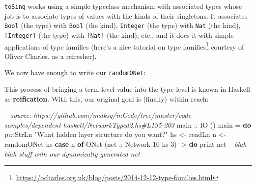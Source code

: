 \documentclass[]{article}
\newenvironment{Shaded}{}{}
\newcommand{\KeywordTok}[1]{\textcolor[rgb]{0.00,0.44,0.13}{\textbf{{#1}}}}
\newcommand{\DataTypeTok}[1]{\textcolor[rgb]{0.56,0.13,0.00}{{#1}}}
\newcommand{\DecValTok}[1]{\textcolor[rgb]{0.25,0.63,0.44}{{#1}}}
\newcommand{\StringTok}[1]{\textcolor[rgb]{0.25,0.44,0.63}{{#1}}}
\newcommand{\CommentTok}[1]{\textcolor[rgb]{0.38,0.63,0.69}{\textit{{#1}}}}
\newcommand{\OtherTok}[1]{\textcolor[rgb]{0.00,0.44,0.13}{{#1}}}
\newcommand{\FunctionTok}[1]{\textcolor[rgb]{0.02,0.16,0.49}{{#1}}}
\newcommand{\NormalTok}[1]{{#1}}
\renewcommand{\href}[2]{#2\footnote{\url{#1}}}
\begin{document}
\texttt{toSing} works using a simple typeclass mechanism with associated types
whose job is to associate types of values with the kinds of their singletons. It
associates \texttt{Bool} (the type) with \texttt{Bool} (the kind),
\texttt{Integer} (the type) with \texttt{Nat} (the kind), \texttt{{[}Integer{]}}
(the type) with \texttt{{[}Nat{]}} (the kind), etc., and it does it with simple
applications of type families (here's a
\href{https://ocharles.org.uk/blog/posts/2014-12-12-type-families.html}{nice
tutorial on type families} courtesy of Oliver Charles, as a refresher).

We now have enough to write our \texttt{randomONet}:

\begin{Shaded}
\end{Shaded}

This process of bringing a term-level value into the type level is known in
Haskell as \textbf{reification}. With this, our original goal is (finally)
within reach:

\begin{Shaded}
\begin{Highlighting}[]
\CommentTok{-- source: https://github.com/mstksg/inCode/tree/master/code-samples/dependent-haskell/NetworkTyped2.hs#L195-203}
\OtherTok{main ::} \DataTypeTok{IO} \NormalTok{()}
\NormalTok{main }\FunctionTok{=} \KeywordTok{do}
    \NormalTok{putStrLn }\StringTok{"What hidden layer structure do you want?"}
    \NormalTok{hs }\OtherTok{<-} \NormalTok{readLn}
    \NormalTok{n  }\OtherTok{<-} \NormalTok{randomONet hs}
    \KeywordTok{case} \NormalTok{n }\KeywordTok{of}
      \DataTypeTok{ONet} \NormalTok{(}\OtherTok{net ::} \DataTypeTok{Network} \DecValTok{10} \NormalTok{hs }\DecValTok{3}\NormalTok{) }\OtherTok{->} \KeywordTok{do}
        \NormalTok{print net}
        \CommentTok{-- blah blah stuff with our dynamically generated net}
\end{Highlighting}
\end{Shaded}
\end{document}
